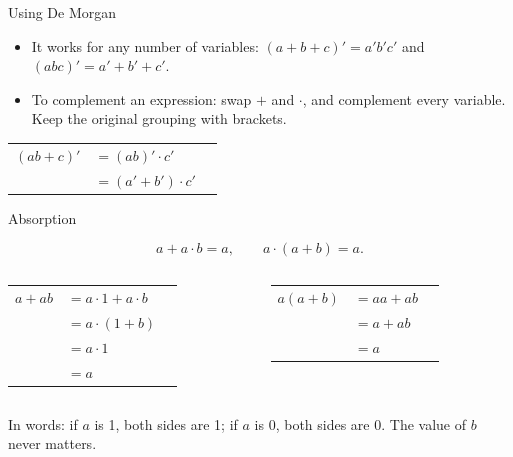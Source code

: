 \documentclass[10pt]{wosm-slides}
\makeatletter
\newenvironment{derivation}
  {\begin{tabular}{@{}r@{\;}l@{\qquad}l@{}}}
  {\end{tabular}}
\newcommand*\by[1]{\wosmlabel{#1}}
\makeatother
\begin{document}
\begin{frame}{Using De Morgan}
  \begin{itemize}
    \item It works for any number of variables:
      $(a + b + c)' = a'b'c'$ and $(abc)' = a' + b' + c'$.
    \item To complement an expression: swap $+$ and $\cdot$, and complement every
      variable. Keep the original grouping with brackets.
  \end{itemize}

  \begin{example}[Complement of $ab + c$]
    \small
    \begin{derivation}
      $(ab + c)'$ & $= (ab)' \cdot c'$ & \by{De Morgan} \\
                  & $= (a' + b') \cdot c'$ & \by{De Morgan} \\
    \end{derivation}
  \end{example}

\end{frame}

\begin{frame}{Absorption}
  \begin{theorem}[Absorption]
    \[ a + a \cdot b = a, \qquad a \cdot (a + b) = a. \]
  \end{theorem}

  \begin{columns}[T, totalwidth=\textwidth]
      \small
      \begin{derivation}
        $a + ab$ & $= a \cdot 1 + a \cdot b$ & \by{identity} \\
                 & $= a \cdot (1 + b)$ & \by{distributivity} \\
                 & $= a \cdot 1$ & \by{domination} \\
                 & $= a$ & \by{identity} \\
      \end{derivation}
      \small
      \begin{derivation}
        $a(a + b)$ & $= aa + ab$ & \by{distributivity} \\
                   & $= a + ab$ & \by{idempotence} \\
                   & $= a$ & \by{the left proof} \\
      \end{derivation}
  \end{columns}

  \bigskip
  In words: if $a$ is 1, both sides are 1; if $a$ is 0, both sides are 0. The value of
  $b$ never matters.
\end{frame}
\end{document}
